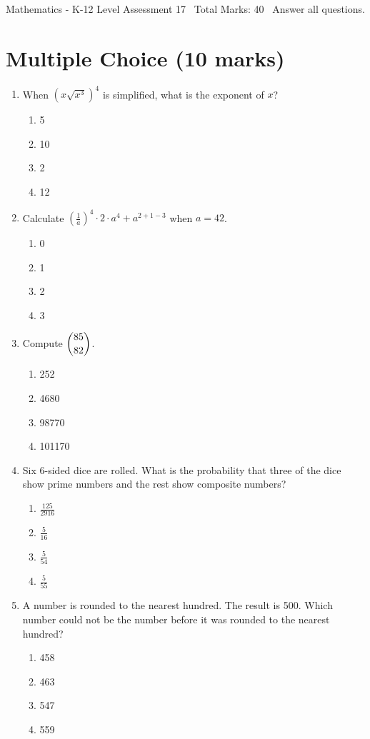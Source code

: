 \documentclass[12pt]{article}
\begin{document}
\begin{center}
Mathematics - K-12 Level Assessment 17 \
Total Marks: 40 \
Answer all questions.
\end{center}

\section*{Multiple Choice (10 marks)}
\begin{enumerate}[label=\arabic*.]
\item When $(x\sqrt{x^3})^4$ is simplified, what is the exponent of $x$?
\begin{enumerate}[label=(\alph*)]
    \item 5
    \item 10
    \item 2
    \item 12
\end{enumerate}
\item Calculate $\left(\frac{1}{a}\right)^4 \cdot 2 \cdot a^4+a^{2+1-3}$ when $a=42$.
\begin{enumerate}[label=(\alph*)]
    \item 0
    \item 1
    \item 2
    \item 3
\end{enumerate}
\item Compute $\dbinom{85}{82}$.
\begin{enumerate}[label=(\alph*)]
    \item 252
    \item 4680
    \item 98770
    \item 101170
\end{enumerate}
\item Six 6-sided dice are rolled. What is the probability that three of the dice show prime numbers and the rest show composite numbers?
\begin{enumerate}[label=(\alph*)]
    \item \ensuremath{\frac{125}{2916}}
    \item \ensuremath{\frac{5}{16}}
    \item \ensuremath{\frac{5}{54}}
    \item \ensuremath{\frac{5}{55}}
\end{enumerate}
\item A number is rounded to the nearest hundred. The result is 500. Which number could not be the number before it was rounded to the nearest hundred?
\begin{enumerate}[label=(\alph*)]
    \item 458
    \item 463
    \item 547
    \item 559
\end{enumerate}
\end{enumerate}
\end{document}
